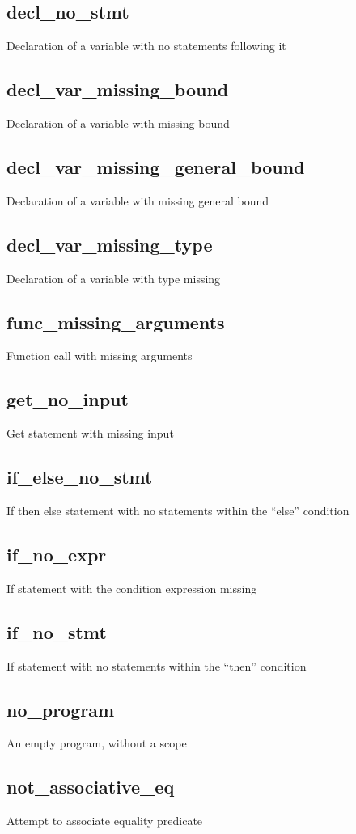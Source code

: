 \documentclass[oneside]{amsart}
\theoremstyle{definition}
\theoremstyle{remark}
\numberwithin{equation}{section}
\begin{document}
\subsection{decl\_no\_stmt} Declaration of a variable with no statements following it
\subsection{decl\_var\_missing\_bound} Declaration of a variable with missing bound
\subsection{decl\_var\_missing\_general\_bound} Declaration of a variable with missing general bound
\subsection{decl\_var\_missing\_type} Declaration of a variable with type missing
\subsection{func\_missing\_arguments} Function call with missing arguments
\subsection{get\_no\_input} Get statement with missing input
\subsection{if\_else\_no\_stmt} If then else statement with no statements within the ``else'' condition
\subsection{if\_no\_expr} If statement with the condition expression missing
\subsection{if\_no\_stmt} If statement with no statements within the ``then'' condition
\subsection{no\_program} An empty program, without a scope
\subsection{not\_associative\_eq} Attempt to associate equality predicate
\end{document}
